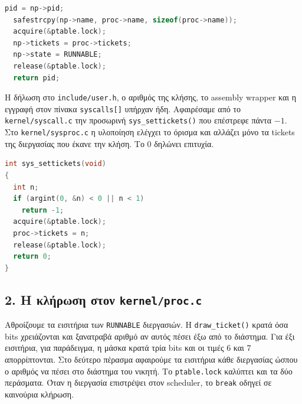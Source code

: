 \documentclass[11pt,a4paper]{article}
\begin{document}
\begin{lstlisting}[language=C,firstnumber=154,basicstyle=\ttfamily\scriptsize,lineskip=-0.7pt]
  pid = np->pid;
  safestrcpy(np->name, proc->name, sizeof(proc->name));
  acquire(&ptable.lock);
  np->tickets = proc->tickets;
  np->state = RUNNABLE;
  release(&ptable.lock);
  return pid;
\end{lstlisting}
Η δήλωση στο \texttt{include/user.h}, ο αριθμός της κλήσης, το assembly wrapper και η εγγραφή στον πίνακα \texttt{syscalls[]} υπήρχαν ήδη. Αφαιρέσαμε από το \texttt{kernel/syscall.c} την προσωρινή \texttt{sys\_settickets()} που επέστρεφε πάντα $-1$. Στο \texttt{kernel/sysproc.c} η υλοποίηση ελέγχει το όρισμα και αλλάζει μόνο τα tickets της διεργασίας που έκανε την κλήση. Το 0 δηλώνει επιτυχία.

\begin{lstlisting}[language=C,firstnumber=38,basicstyle=\ttfamily\scriptsize,lineskip=-0.7pt]
int sys_settickets(void)
{
  int n;
  if (argint(0, &n) < 0 || n < 1)
    return -1;
  acquire(&ptable.lock);
  proc->tickets = n;
  release(&ptable.lock);
  return 0;
}
\end{lstlisting}

\clearpage
\subsection*{2. Η κλήρωση στον \texttt{kernel/proc.c}}
Αθροίζουμε τα εισιτήρια των \texttt{RUNNABLE} διεργασιών. Η \texttt{draw\_ticket()} κρατά όσα bits χρειάζονται και ξανατραβά αριθμό αν αυτός πέσει έξω από το διάστημα. Για έξι εισιτήρια, για παράδειγμα, η μάσκα κρατά τρία bits και οι τιμές 6 και 7 απορρίπτονται. 
Στο δεύτερο πέρασμα αφαιρούμε τα εισιτήρια κάθε διεργασίας ώσπου ο αριθμός να πέσει στο διάστημα του νικητή. Το \texttt{ptable.lock} καλύπτει και τα δύο περάσματα. Όταν η διεργασία επιστρέψει στον scheduler, το \texttt{break} οδηγεί σε καινούρια κλήρωση.
\end{document}
